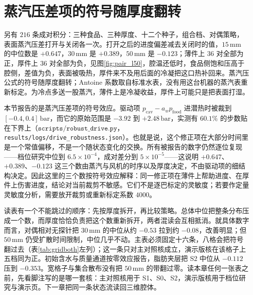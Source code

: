 \section{蒸汽压差项的符号随厚度翻转}

另有 \(216\) 条成对积分：三种食品、三种厚度、十二个种子，组合档、对偶策略，表面蒸汽压差打开与关闭各一次。打开之后的进度偏差减去关闭时的值，\(15\,\mathrm{mm}\) 的中位数是 \(+0.647\)，\(30\,\mathrm{mm}\) 是 \(+0.389\)，\(50\,\mathrm{mm}\) 是 \(-0.123\)；薄件上 \(36\) 对全部为正，厚件上 \(36\) 对全部为负，见图\ref{fig:pair_l50}，腔温还低时，食品侧饱和压高于腔侧，差值为负，表面被吸热，厚件来不及用后面的冷凝把这口热补回来。蒸汽压公式的符号随厚度翻转；Antoine 系数取自标准水表，没有用这台机器的蒸汽表重新标定。为冷点多送一股蒸汽，薄件上是冷凝收益，厚件上可能只是把表面打湿。

本节报告的是蒸汽压差项的符号效应。驱动项 \(p_{\mathrm{cav}}-a_w p_{\mathrm{food}}\) 进潜热时被裁到 \([-0.4,0.4]\,\mathrm{bar}\)，而它的原始范围是 \(-3.92\) 到 \(+2.48\,\mathrm{bar}\)，实测有 \(60.1\%\) 的步数贴在下界上（\(\texttt{scripts/robust\_drive.py}\)，\texttt{results/logs/drive\_robustness.json}）。也就是说，这个修正项在大部分时间里是一个常值偏移，不是一个随状态变化的交换。所有被报告的数字仍然逐位复现——档位研究中位到 \(6.5\times10^{-4}\)，成对差分到 \(5\times10^{-5}\)——这说明 \(+0.647\)、\(+0.389\)、\(-0.123\) 这三个数由蒸汽与风机的时序以及厚度决定，不由驱动项的细结构决定。因此这里的三个数按符号效应解释：同一修正项在薄件上帮助进度、在厚件上伤害进度，结论对当前裁剪不敏感。它们不是逐巴标定的灵敏度；若要作定量灵敏度分析，需要放开裁剪或重新标定系数 \(4000\)。

读表有一个不能跳过的顺序：先按厚度拆开，再比较策略。总体中位把整条分布压成一个数，而厚度恰恰负责把这个数重新拆开，两者混读会互相抵消。就具体数字而言，对偶相对无探针把 \(30\,\mathrm{mm}\) 的中位从约 \(-0.53\) 拉到约 \(-0.08\)，改善明显；但 \(50\,\mathrm{mm}\) 仍受扩散时间限制，中位几乎不动。主表必须固定十六条，八格会把符号翻过去（表\ref{tab:gridboth}{}左列）；这一条只对主对照核成立，演示版核在该格子上五档同为正。初始含水与质量通道按零效应报告，脂肪夹层把 S2 中位从 \(-0.112\) 压到 \(-0.353\)。宽格子与集合散布没有把 \(50\,\mathrm{mm}\) 的带翻过零。读本章任何一张表之前，先看脚注写的是哪一套核：主对照核用于 S1、S0、S2，演示版核用于档位研究与演示页。下一章把同一条状态流读回三维腔体。
\FloatBarrier


